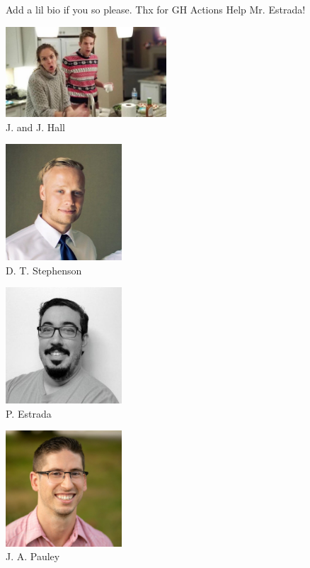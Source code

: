 \vspace{-0.9in}
Add a lil bio if you so please. Thx for GH Actions Help Mr. Estrada!
\vspace{0.25in}
\begin{multicols}{2}
    \begin{center}
    \includegraphics[width=0.45\textwidth]{Pictures/j&j_mawf_about_authors.jpeg}\\
    J. and J. Hall
\end{center}
\vspace{-0.15in}
\begin{center}
    \includegraphics[width=0.325\textwidth]{Pictures/Dan_bio_pic.jpeg}\\
    D. T. Stephenson
\end{center}
\vspace{-0.15in}
\begin{center}
    \includegraphics[width=0.325\textwidth]{Pictures/pedro_bio.png}\\
    P. Estrada
\end{center}
\vspace{-0.15in}
\begin{center}
    \includegraphics[width=0.325\textwidth]{Pictures/jake_bio_pic.jpeg}\\
    J. A. Pauley
\end{center}
\end{multicols}
